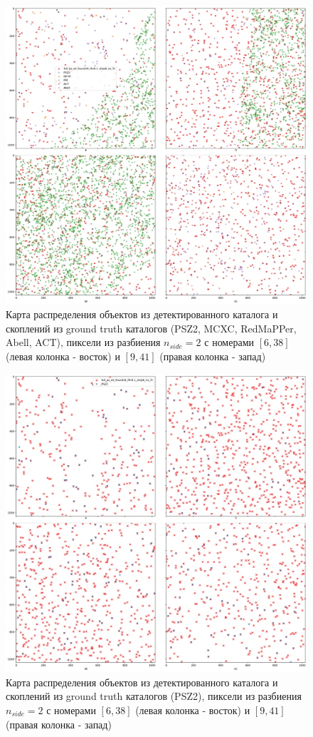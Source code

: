 \documentclass{article}
\begin{document}
\begin{figure}[h]
\includegraphics[width=\linewidth]{map_all}
\caption{Карта распределения объектов из детектированного каталога и скоплений из ground truth 
    каталогов (PSZ2, MCXC, RedMaPPer, Abell, ACT), пиксели из разбиения $n_{side}=2$ с номерами
    $[6, 38]$ (левая колонка - восток) и $[9, 41]$ (правая колонка - запад)}
\label{Fig:Map_All}
\end{figure}

\begin{figure}[h]
\includegraphics[width=\linewidth]{map_psz2}
\caption{Карта распределения объектов из детектированного каталога и скоплений из ground truth 
    каталогов (PSZ2), пиксели из разбиения $n_{side}=2$ с номерами
    $[6, 38]$ (левая колонка - восток) и $[9, 41]$ (правая колонка - запад)}
\label{Fig:Map_PSZ2}
\end{figure}
\end{document}
